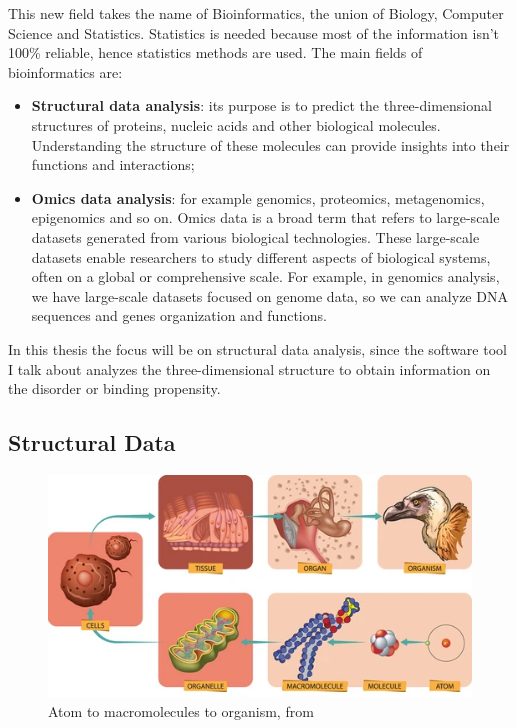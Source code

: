 This new field takes the name of Bioinformatics, the union of Biology, Computer Science and Statistics. Statistics is needed because most of the information isn't 100\% reliable, hence statistics methods are used.
The main fields of bioinformatics are:
\begin{itemize}
    \item \textbf{Structural data analysis}: its purpose is to predict the three-dimensional structures of proteins, nucleic acids and other biological molecules. Understanding the structure of these molecules can provide insights into their functions and interactions;
    \item \textbf{Omics data analysis}: for example genomics, proteomics, metagenomics, epigenomics and so on. Omics data is a broad term that refers to large-scale datasets generated from various biological technologies. These large-scale datasets enable researchers to study different aspects of biological systems, often on a global or comprehensive scale. For example, in genomics analysis, we have large-scale datasets focused on genome data, so we can analyze DNA sequences and genes organization and functions.
\end{itemize}

In this thesis the focus will be on structural data analysis, since the software tool I talk about analyzes the three-dimensional structure to obtain information on the disorder or binding propensity.

\vspace{5em}
\pagebreak

\subsection{Structural Data}

\begin{figure}[h!]
    \centering
    \includegraphics{res/proteins_overview/atom_bird.png}
    \caption{Atom to macromolecules to organism, from \cite{atombird}}
    \label{fig:atom-bird}
\end{figure}

